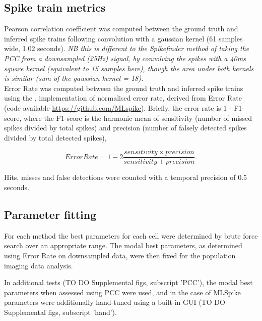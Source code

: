 \documentclass[a4paper,10pt,twocolumn]{article}
\begin{document}
\subsection*{Spike train metrics}
Pearson correlation coefficient was computed between the ground truth and inferred spike trains following convolution with a gaussian kernel (61 samples wide, 1.02 seconds). \emph{NB this is different to the Spikefinder method of taking the PCC from a downsampled (25Hz) signal, by convolving the spikes with a 40ms square kernel (equivalent to 15 samples here), though the area under both kernels is similar (sum of the gaussian kernel = 18).}\\
Error Rate was computed between the ground truth and inferred spike trains using the \cite{Deneux2016-gu}, implementation of normalised error rate, derived from \cite{Victor1996-cg} Error Rate (code available \href{https://github.com/MLspike}{https://github.com/MLspike}). Briefly, the error rate is 1 - F1-score, where the F1-score is the harmonic mean of sensitivity (number of missed spikes divided by total spikes) and precision (number of falsely detected spikes divided by total detected spikes),

\[Error Rate = 1 - 2 \frac{sensitivity \times precision}{sensitivity + precision}.\]

Hits, misses and false detections were counted with a temporal precision of 0.5 seconds.

\subsection*{Parameter fitting}
For each method the best parameters for each cell were determined by brute force search over an appropriate range. The modal best parameters, as determined using Error Rate on downsampled data, were then fixed for the population imaging data analysis. 

In additional tests (TO DO Supplemental figs, subscript 'PCC'), the modal best parameters when assessed using PCC were used, and in the case of MLSpike parameters were additionally hand-tuned using a built-in GUI (TO DO Supplemental figs, subscript 'hand'). 

\end{document}
